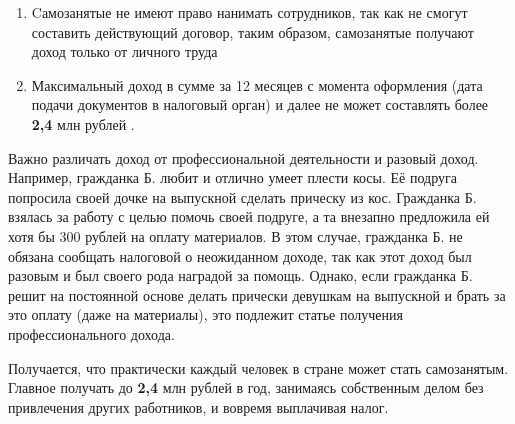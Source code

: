 \begin{enumerate}
	\item Cамозанятые не имеют право нанимать сотрудников, так как не смогут составить действующий договор, таким образом, самозанятые получают доход только от личного труда 
	
	\item Максимальный доход в сумме за 12 месяцев с момента оформления (дата подачи документов в налоговый орган) и далее не может составлять более \textbf{2,4} млн рублей \cite{kontur}.
\end{enumerate}

Важно различать доход от профессиональной деятельности и разовый доход.
Например, гражданка Б. любит и отлично умеет плести косы. 
Её подруга попросила своей дочке на выпускной сделать прическу из кос. 
Гражданка Б. взялась за работу с целью помочь своей подруге, 
а та внезапно предложила ей хотя бы 300 рублей на оплату материалов. 
В этом случае, гражданка Б. не обязана сообщать налоговой о неожиданном доходе, 
так как этот доход был разовым и был своего рода наградой за помощь.
Однако, если гражданка Б. решит на постоянной основе делать 
прически девушкам на выпускной и брать за это оплату (даже на материалы), 
это подлежит статье получения профессионального дохода. 

Получается, что практически каждый человек в стране может стать самозанятым.
Главное 
получать до \textbf{2,4} млн рублей в год, 
занимаясь собственным делом
без привлечения других работников,
и вовремя выплачивая налог.